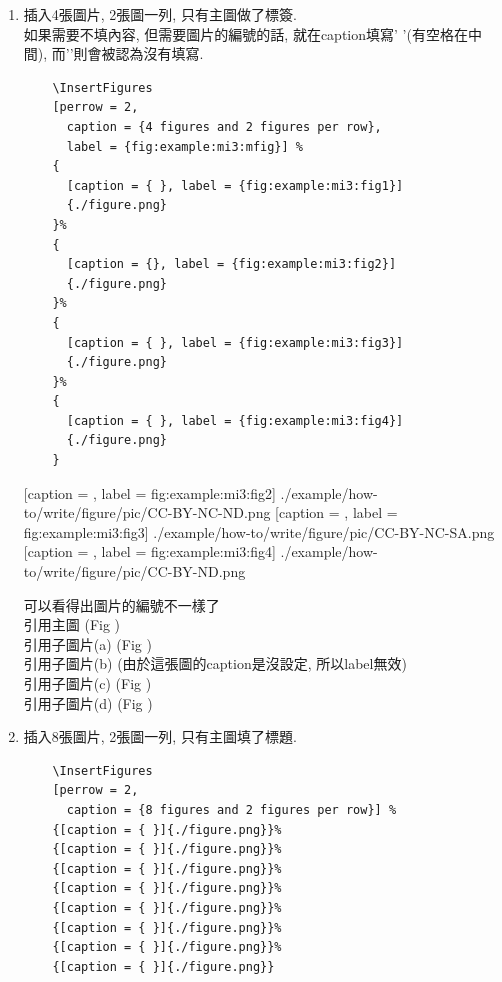 \begin{enumerate}
{    e.g: 
    引用主圖 (Fig ) ,
    引用子圖片 (Fig , Fig ).
  } %

  \newpage
  \item
  {
    插入4張圖片, 2張圖一列, 只有主圖做了標簽.\\
    如果需要不填內容, 但需要圖片的編號的話, 就在caption填寫'{ }'(有空格在中間), 而'{}'則會被認為沒有填寫.
    \begin{verbatim}
    \InsertFigures
    [perrow = 2,
      caption = {4 figures and 2 figures per row},
      label = {fig:example:mi3:mfig}] %
    {
      [caption = { }, label = {fig:example:mi3:fig1}]
      {./figure.png}
    }%
    {
      [caption = {}, label = {fig:example:mi3:fig2}]
      {./figure.png}
    }%
    {
      [caption = { }, label = {fig:example:mi3:fig3}]
      {./figure.png}
    }%
    {
      [caption = { }, label = {fig:example:mi3:fig4}]
      {./figure.png}
    }
    \end{verbatim}

    {
      [caption = {},
      label = {fig:example:mi3:fig2}]      
      {./example/how-to/write/figure/pic/CC-BY-NC-ND.png}
    }%
    {
      [caption = { },
      label = {fig:example:mi3:fig3}]      
      {./example/how-to/write/figure/pic/CC-BY-NC-SA.png}
    }%
    {
      [caption = { },
      label = {fig:example:mi3:fig4}]      
      {./example/how-to/write/figure/pic/CC-BY-ND.png}
    }

    可以看得出圖片的編號不一樣了\\
    引用主圖 (Fig )\\
    引用子圖片(a) (Fig )\\
    引用子圖片(b) (由於這張圖的caption是沒設定, 所以label無效)\\
    引用子圖片(c) (Fig )\\
    引用子圖片(d) (Fig )
  } %

  \newpage
  \item
  {
    插入8張圖片, 2張圖一列, 只有主圖填了標題.\\
    \begin{verbatim}
    \InsertFigures
    [perrow = 2,
      caption = {8 figures and 2 figures per row}] %
    {[caption = { }]{./figure.png}}%
    {[caption = { }]{./figure.png}}%
    {[caption = { }]{./figure.png}}%
    {[caption = { }]{./figure.png}}%
    {[caption = { }]{./figure.png}}%
    {[caption = { }]{./figure.png}}%
    {[caption = { }]{./figure.png}}%
    {[caption = { }]{./figure.png}}
    \end{verbatim}

}
\end{enumerate}
